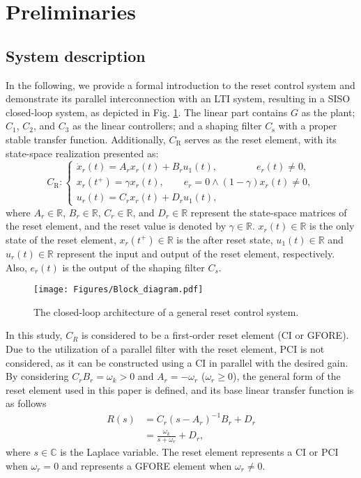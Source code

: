 \section{Preliminaries}\label{sec: preliminaries}
\subsection{System description}
In the following, we provide a formal introduction to the reset control system and demonstrate its parallel interconnection with an LTI system, resulting in a SISO closed-loop system, as depicted in Fig. \ref{fig:Block diagram cl}. The linear part contains $G$ as the plant; $C_{1}$, $C_{2}$, and $C_{3}$ as the linear controllers; and a shaping filter $C_\text{s}$ with a proper stable transfer
function. Additionally, $C_\text{R}$ serves as the reset element, with its state-space realization presented as:
\begin{equation} 
		C_\text{R} : \begin{cases}
            \dot{x}_r(t)=A_rx_r(t)+B_ru_1(t),  \qquad \qquad e_r(t)\neq0,\\
            x_r(t^+)=\gamma x_r(t), \qquad e_r=0\wedge(1-\gamma)x_r(t)\neq0,\\
            u_r(t)=C_rx_r(t)+D_ru_1(t),
		\end{cases}
  \label{eq.SS reset}
	\end{equation}
where $A_r\in\mathbb{R}$, $B_r\in\mathbb{R}$, $C_r\in\mathbb{R}$, and $D_r\in\mathbb{R}$ represent the state-space matrices of the reset element, and the reset value is denoted by $\gamma \in\mathbb{R} $. $x_r(t)\in\mathbb{R}$ is the only state of the reset element, $x_r(t^{+})\in\mathbb{R}$ is the after reset state, $u_1(t)\in\mathbb{R}$ and $u_r(t)\in\mathbb{R}$ represent the input and output of the reset element, respectively. Also, $e_r(t)$ is the output of the shaping filter $C_s$.

\begin{figure}[!t]
\centerline{\texttt{[image: Figures/Block\_diagram.pdf]}}
\caption{The closed-loop architecture of a general reset control system.}
\label{fig:Block diagram cl}
\end{figure}

In this study, $C_R$ is considered to be a first-order reset element (CI or GFORE). Due to the utilization of a parallel filter with the reset element, PCI is not considered, as it can be constructed using a CI in parallel with the desired gain. By considering $C_rB_r=\omega_k>0$ and $A_r=-\omega_r$ ($\omega_r\geq0$), the general form of the reset element used in this paper is defined, and its base linear transfer function is as follows
\begin{equation}
\begin{split}
    \label{RCS expression}
    R(s)&=C_r(s-A_r)^{-1}B_r+D_r \\
    &=\frac{\omega_k}{s+\omega_r}+D_r,
    \end{split}
\end{equation}
where $s \in\mathbb{C}$ is the Laplace variable. The reset element represents a CI or PCI when $\omega_r=0$ and represents a GFORE element when $\omega_r \neq0$.

